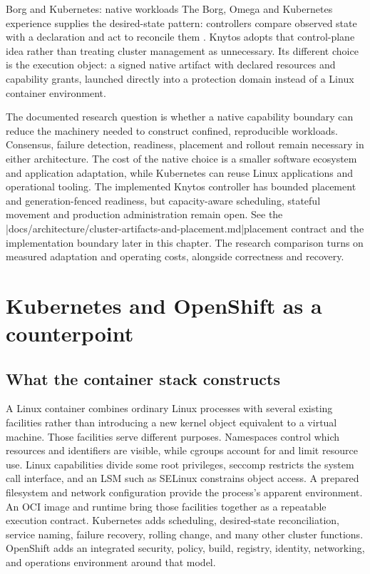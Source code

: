 \begin{architecturalcomparison}{Borg and Kubernetes: native workloads}
The Borg, Omega and Kubernetes experience supplies the desired-state pattern:
controllers compare observed state with a declaration and act to reconcile
them \cite{prior:borg}. Knytos adopts that control-plane idea rather
than treating cluster management as unnecessary. Its different choice is the
execution object: a signed native artifact with declared resources and
capability grants, launched directly into a protection domain instead of a
Linux container environment.

The documented research question is whether a native capability boundary can
reduce the machinery needed to construct confined, reproducible workloads.
Consensus, failure detection, readiness, placement and rollout remain necessary
in either architecture. The cost of the native choice is a smaller software
ecosystem and application adaptation, while Kubernetes can reuse Linux
applications and operational tooling. The implemented Knytos controller
has bounded placement and generation-fenced readiness, but capacity-aware
scheduling, stateful movement and production administration remain open.
See the \repofiletext|docs/architecture/cluster-artifacts-and-placement.md|{placement
contract} and the implementation boundary later in this chapter. The research
comparison turns on measured adaptation and operating costs, alongside
correctness and recovery.
\end{architecturalcomparison}

\section{Kubernetes and OpenShift as a counterpoint}

\subsection{What the container stack constructs}

A Linux container combines ordinary Linux processes with several existing
facilities rather than introducing a new kernel object equivalent to a virtual
machine. Those facilities serve different purposes. Namespaces control which
resources and identifiers are visible, while cgroups account for and limit
resource use. Linux capabilities divide some root privileges, seccomp restricts
the system call interface, and an LSM such as SELinux constrains object access.
A prepared filesystem and network configuration provide the process's apparent
environment. An OCI image and runtime bring those facilities together as a
repeatable execution contract. Kubernetes adds scheduling, desired-state
reconciliation, service naming, failure recovery, rolling change, and many
other cluster functions. OpenShift adds an integrated security, policy,
build, registry, identity, networking, and operations environment around
that model.

